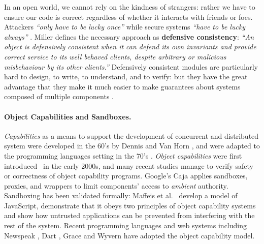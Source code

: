 
In an open world, we cannot rely on the kindness of strangers: rather
we have to ensure our code is correct regardless of whether it
interacts with friends or foes.
Attackers 
\textit{``only have to be lucky once''} while secure systems 
\textit{``have to be lucky always''} \cite{IRAThatcher}.
Miller \cite{miller-esop2013,MillerPhD} defines the necessary approach
as \textbf{defensive consistency}: \textit{``An object is defensively
  consistent when it can defend its own invariants and provide correct
  service to its well behaved clients, despite arbitrary or malicious
  misbehaviour by its other clients.''}  Defensively consistent
modules are particularly hard to design, to write, to understand, and
to verify: but they have the great advantage that they make it much
easier to make guarantees about systems composed of multiple components
\cite{Murray10dphil}.


\paragraph{Object Capabilities and Sandboxes.}
{{\em Capabilities} as a means to support the development of concurrent and distributed system  were developed in the 60's
by Dennis and Van Horn \cite{Dennis66}, and were adapted to the
programming languages setting in the 70's \cite{JamesMorris}. 
{\em Object capabilities} were first introduced~\cite{MillerPhD} in the early 2000s},
 and many recent %
studies manage
to verify  safety or correctness of object capability programs.
Google's Caja \cite{Caja} applies   sandboxes, proxies, and wrappers
 to limit components'
access to \textit{ambient} authority.
Sandboxing has been validated
formally: Maffeis et al.\ \cite{mmt-oakland10} develop a model of
JavaScript, demonstrate that it obeys two principles of
object capability systems
and show  how untrusted applications can be prevented from interfering with
the rest of the system. 
Recent programming languages and web systems
\cite{CapJavaHayesAPLAS17,CapNetSocc17Eide,DOCaT14} including Newspeak
\cite{newspeak17}, Dart \cite{dart15}, Grace \cite{grace,graceClasses}
and Wyvern \cite{wyverncapabilities} have adopted the object
capability model.

